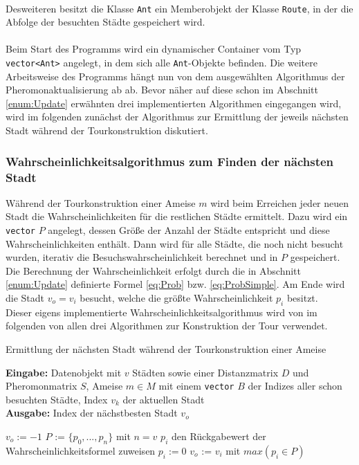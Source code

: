 \documentclass[doktyp=barbeit, sprache=german]{TUBAFarbeiten}
\begin{document}
\\Desweiteren besitzt die Klasse \texttt{Ant} ein Memberobjekt der Klasse \texttt{Route}, in der die Abfolge der besuchten Städte gespeichert wird. 
\\\\Beim Start des Programms wird ein dynamischer Container vom Typ \texttt{vector<Ant>} angelegt, in dem sich alle \texttt{Ant}-Objekte befinden. Die weitere Arbeitsweise des Programms hängt nun von dem ausgewählten Algorithmus der Pheromonaktualisierung ab ab. Bevor näher auf diese schon im Abschnitt \ref{enum:Update} erwähnten drei implementierten Algorithmen eingegangen wird, wird im folgenden zunächst der Algorithmus zur Ermittlung der jeweils nächsten Stadt während der Tourkonstruktion diskutiert. 
\subsubsection{Wahrscheinlichkeitsalgorithmus zum Finden der nächsten Stadt}
Während der Tourkonstruktion einer Ameise $m$ wird beim Erreichen jeder neuen Stadt die Wahrscheinlichkeiten für die restlichen Städte ermittelt. 
Dazu wird ein \texttt{vector} $P$ angelegt, dessen Größe der Anzahl der Städte entspricht und diese Wahrscheinlichkeiten enthält. Dann wird für alle Städte, die noch nicht besucht wurden, iterativ die Besuchswahrscheinlichkeit berechnet und in $P$ gespeichert. Die Berechnung der Wahrscheinlichkeit erfolgt durch die in Abschnitt \ref{enum:Update} definierte Formel \ref{eq:Prob} bzw. \ref{eq:ProbSimple}. Am Ende wird die Stadt $v_o = v_i$ besucht, welche die größte Wahrscheinlichkeit $p_i$ besitzt. \\Dieser eigens implementierte Wahrscheinlichkeitsalgorithmus wird von im folgenden von allen drei Algorithmen zur Konstruktion der Tour verwendet.
\begin{algorithm}
\caption{Ermittlung der nächsten Stadt während der Tourkonstruktion einer Ameise}
\label{probabilityAlg}
\textbf{Eingabe:} Datenobjekt mit $v$ Städten sowie einer Distanzmatrix $D$ und Pheromonmatrix $S$, Ameise $m \in M$ mit einem \texttt{vector} $B$ der Indizes aller schon besuchten Städte, Index $v_k$ der aktuellen Stadt
\\\textbf{Ausgabe:} Index der nächstbesten Stadt $v_o$
\begin{algorithmic}[1]
\State $v_o := -1$
\State $P$ := $\{p_0, ..., p_n\}$ mit $n = v$ 
\State $p_i$ den Rückgabewert der Wahrscheinlichkeitsformel zuweisen
\Else 
\State $p_i := 0$
\EndIf
\EndFor
\State $v_o$ := $v_i$ mit $max(p_i \in P)$
\end{algorithmic}
\end{algorithm}
\end{document}
